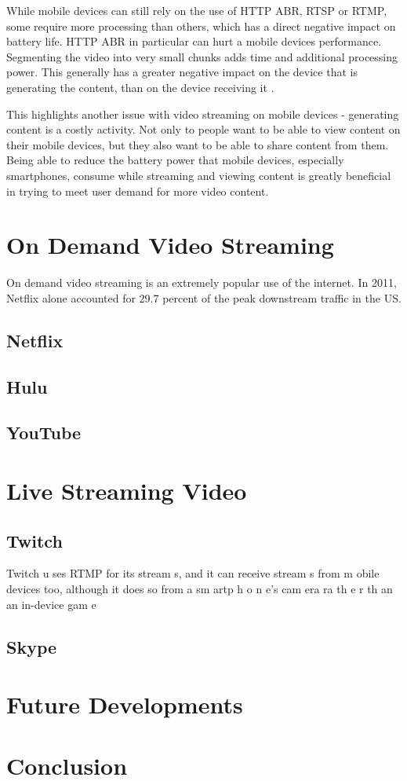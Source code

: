 \documentclass[12pt]{article}
\begin{document}
While mobile devices can still rely on the use of HTTP ABR, RTSP or RTMP, some require more processing than others, which has a direct negative impact on battery life.  HTTP ABR in particular can hurt a mobile devices performance.  Segmenting the video into very small chunks adds time and additional processing power.  This generally has a greater negative impact on the device that is generating the content, than on the device receiving it \cite{11720476820160701}.

This highlights another issue with video streaming on mobile devices - generating content is a costly activity.  Not only to people want to be able to view content on their mobile devices, but they also want to be able to share content from them.  Being able to reduce the battery power that mobile devices, especially smartphones, consume while streaming and viewing content is greatly beneficial in trying to meet user demand for more video content.

\section{On Demand Video Streaming}
On demand video streaming is an extremely popular use of the internet.  In 2011, Netflix alone accounted for 29.7 percent of the peak downstream traffic in the US.

\subsection{Netflix}

\subsection{Hulu}

\subsection{YouTube}


\section{Live Streaming Video}


\subsection{Twitch}
Twitch u ses RTMP
for its stream s, and it can receive stream s from
m obile devices too, although it does so from a
sm artp h o n e’s cam era ra th e r th an an in-device
gam e \cite{11720476820160701}

\subsection{Skype}

\section{Future Developments}

\section{Conclusion}

\clearpage
{}

\end{document}
